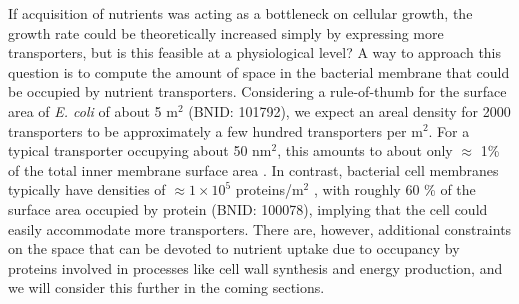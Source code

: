 If acquisition of nutrients was acting as a bottleneck on cellular growth, the growth rate could be theoretically
increased simply by expressing more transporters, but is this feasible at a
physiological level? A way to approach this question is to compute the amount of
space in the bacterial membrane that could be occupied by nutrient transporters.
Considering a rule-of-thumb for the surface area of \textit{E. coli} of about 5
\textmu m$^2$ (BNID: 101792), we expect an areal density for 2000 transporters
to be approximately a few hundred transporters per \textmu m$^2$. For a typical transporter
occupying about 50 nm$^2$, this amounts to about only $\approx$ 1\% of the total
inner membrane surface area \citep{szenk2017}. In contrast, bacterial cell membranes
typically have densities of $\approx 1 \times 10^5$ proteins/\textmu m$^2$ \citep{phillips2018},
with roughly 60 \% of the surface area occupied by protein (BNID: 100078),
implying that the cell could easily accommodate more transporters. There are,
however, additional constraints on the space that  can be devoted to nutrient
uptake due to occupancy by proteins involved in processes like cell wall
synthesis and energy production, and we will consider this further in the coming
sections.
